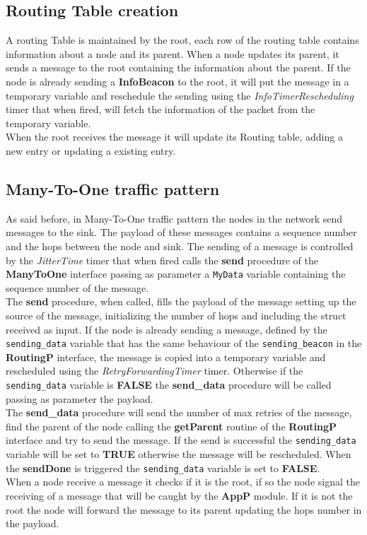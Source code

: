 \documentclass{article}
\begin{document}
\subsection{Routing Table creation}
    A routing Table is maintained by the root, each row of the routing table contains information about a node and its parent. When a node updates its parent, it sends a message to the root containing the information about the parent. If the node is already sending a \textbf{InfoBeacon} to the root, it will put the message in a temporary variable and reschedule the sending using the \emph{InfoTimerRescheduling} timer that when fired, will fetch the information of the packet from the temporary variable. \\
    When the root receives the message it will update its Routing table, adding a new entry or updating a existing entry.
    \subsection{Many-To-One traffic pattern}
    As said before, in Many-To-One traffic pattern the nodes in the network send messages to the sink. The payload of these messages contains a sequence number and the hops between the node and sink. The sending of a message is controlled by the \emph{JitterTime} timer that when fired calls the \textbf{send} procedure of the \textbf{ManyToOne} interface passing as parameter a \texttt{MyData} variable containing the sequence number of the message. \\
    The \textbf{send} procedure, when called, fills the payload of the message setting up the source of the message, initializing the number of hops and including the struct received as input. If the node is already sending a message, defined by the \texttt{sending\_data} variable that has the same behaviour of the \texttt{sending\_beacon} in the \textbf{RoutingP} interface, the message is copied into a temporary variable and rescheduled using the \emph{RetryForwardingTimer} timer. Otherwise if the \texttt{sending\_data} variable is \textbf{FALSE} the \textbf{send\_data} procedure will be called passing as parameter the payload. \\
    The \textbf{send\_data} procedure will send the number of max retries of the message, find the parent of the node calling the \textbf{getParent} routine of the \textbf{RoutingP} interface and try to send the message. If the send is successful the \texttt{sending\_data} variable will be set to \textbf{TRUE} otherwise the message will be rescheduled. When the \textbf{sendDone} is triggered the \texttt{sending\_data} variable is set to \textbf{FALSE}.\\
    When a node receive a message it checks if it is the root, if so the node signal the receiving of a message that will be caught by the \textbf{AppP} module. If it is not the root the node will forward the message to its parent updating the hops number in the payload.
\end{document}
